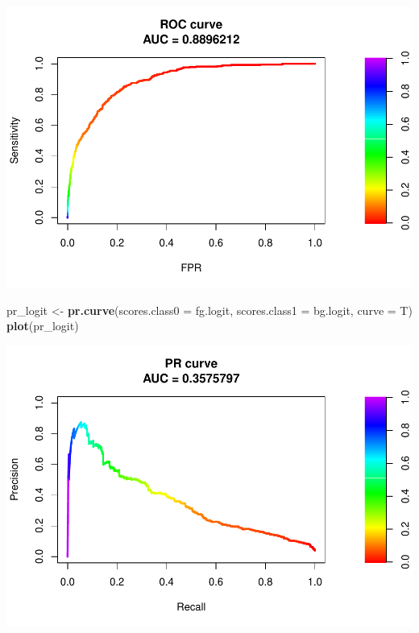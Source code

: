 \documentclass[]{article}
\newenvironment{Shaded}{\begin{snugshade}}{\end{snugshade}}
\newcommand{\DataTypeTok}[1]{\textcolor[rgb]{0.13,0.29,0.53}{#1}}
\newcommand{\DecValTok}[1]{\textcolor[rgb]{0.00,0.00,0.81}{#1}}
\newcommand{\FloatTok}[1]{\textcolor[rgb]{0.00,0.00,0.81}{#1}}
\newcommand{\KeywordTok}[1]{\textcolor[rgb]{0.13,0.29,0.53}{\textbf{#1}}}
\newcommand{\NormalTok}[1]{#1}
\newcommand{\OperatorTok}[1]{\textcolor[rgb]{0.81,0.36,0.00}{\textbf{#1}}}
\newcommand{\StringTok}[1]{\textcolor[rgb]{0.31,0.60,0.02}{#1}}
\begin{document}
\includegraphics{lagged_analyses_files/figure-latex/unnamed-chunk-22-1.pdf}

\begin{Shaded}
\begin{Highlighting}[]
\NormalTok{pr_logit <-}\StringTok{ }\KeywordTok{pr.curve}\NormalTok{(}\DataTypeTok{scores.class0 =}\NormalTok{ fg.logit,}
                     \DataTypeTok{scores.class1 =}\NormalTok{ bg.logit,}
                     \DataTypeTok{curve =}\NormalTok{ T)}
\KeywordTok{plot}\NormalTok{(pr_logit) }
\end{Highlighting}
\end{Shaded}

\includegraphics{lagged_analyses_files/figure-latex/unnamed-chunk-23-1.pdf}

\begin{Shaded}
\end{Shaded}
\end{document}
